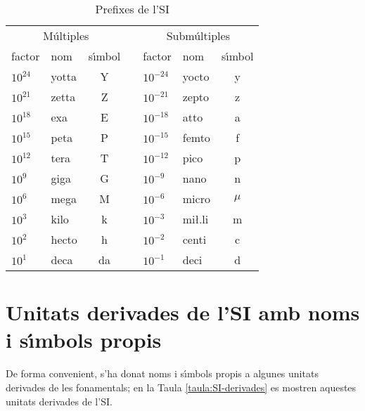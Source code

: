 \begin{table}[h]
   \caption{\label{taula:SI-prefixes} Prefixes de  l'SI}
   \begin{center}\begin{tabular}{llccllc}
   \toprule[1pt]
   \multicolumn{3}{c}{M\'{u}ltiples} & & \multicolumn{3}{c}{Subm\'{u}ltiples}\\
   \cmidrule(rl){1-3} \cmidrule(rl){5-7}
   factor & nom & s\'{\i}mbol & & factor & nom & s\'{\i}mbol\\
   \midrule
    $10^{24}$ &  yotta & Y & & $10^{-24}$ & yocto & y \\
    $10^{21}$ &  zetta & Z & & $10^{-21}$ & zepto & z \\
    $10^{18}$ &  exa & E & & $10^{-18}$ & atto & a \\
    $10^{15}$ &  peta & P & & $10^{-15}$ & femto & f \\
    $10^{12}$ &  tera & T & & $10^{-12}$ & pico & p \\
    $10^{9}$ &  giga & G & & $10^{-9}$ & nano & n \\
    $10^{6}$ &  mega & M & & $10^{-6}$ & micro & $\mu$ \\
    $10^{3}$ &  kilo & k & & $10^{-3}$ & mi{\l.l}i & m \\
    $10^{2}$ &  hecto & h & & $10^{-2}$ & centi & c \\
    $10^{1}$ &  deca & da & & $10^{-1}$ & deci & d \\
    \bottomrule[1pt]
   \end{tabular} \end{center}
\end{table}
      
      
     



\section{Unitats derivades de l'SI amb noms i s\'{\i}mbols propis}

De forma convenient, s'ha donat noms i s\'{\i}mbols propis a algunes unitats derivades de les fonamentals; en la Taula \vref{taula:SI-derivades} es mostren aquestes unitats derivades de l'SI.


